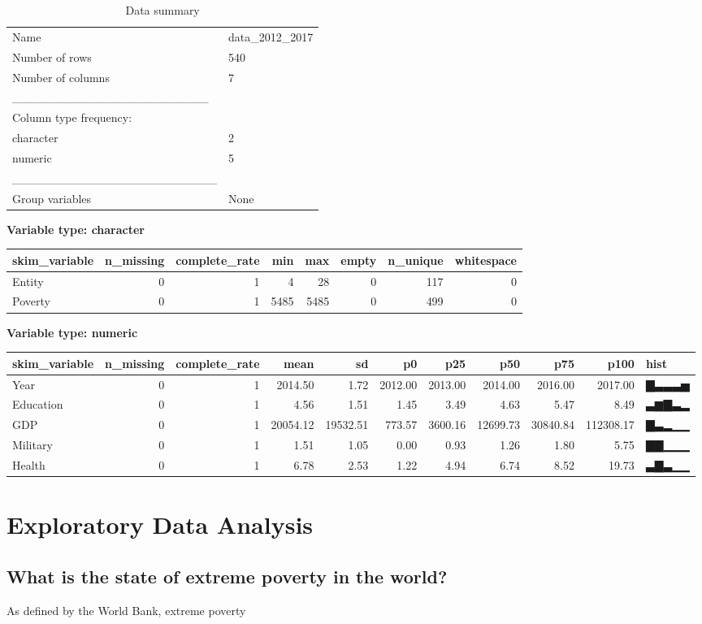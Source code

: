\documentclass[
]{article}
\begin{document}
\begin{longtable}[]{@{}ll@{}}
\caption{Data summary}\tabularnewline
\toprule
\endhead
Name & data\_2012\_2017 \\
Number of rows & 540 \\
Number of columns & 7 \\
\_\_\_\_\_\_\_\_\_\_\_\_\_\_\_\_\_\_\_\_\_\_\_ & \\
Column type frequency: & \\
character & 2 \\
numeric & 5 \\
\_\_\_\_\_\_\_\_\_\_\_\_\_\_\_\_\_\_\_\_\_\_\_\_ & \\
Group variables & None \\
\bottomrule
\end{longtable}

\textbf{Variable type: character}

\begin{longtable}[]{@{}lrrrrrrr@{}}
\toprule
skim\_variable & n\_missing & complete\_rate & min & max & empty &
n\_unique & whitespace \\
\midrule
\endhead
Entity & 0 & 1 & 4 & 28 & 0 & 117 & 0 \\
Poverty & 0 & 1 & 5485 & 5485 & 0 & 499 & 0 \\
\bottomrule
\end{longtable}

\textbf{Variable type: numeric}

\begin{longtable}[]{@{}lrrrrrrrrrl@{}}
\toprule
skim\_variable & n\_missing & complete\_rate & mean & sd & p0 & p25 &
p50 & p75 & p100 & hist \\
\midrule
\endhead
Year & 0 & 1 & 2014.50 & 1.72 & 2012.00 & 2013.00 & 2014.00 & 2016.00 &
2017.00 & ▇▃▃▃▅ \\
Education & 0 & 1 & 4.56 & 1.51 & 1.45 & 3.49 & 4.63 & 5.47 & 8.49 &
▃▆▇▃▂ \\
GDP & 0 & 1 & 20054.12 & 19532.51 & 773.57 & 3600.16 & 12699.73 &
30840.84 & 112308.17 & ▇▃▂▁▁ \\
Military & 0 & 1 & 1.51 & 1.05 & 0.00 & 0.93 & 1.26 & 1.80 & 5.75 &
▇▇▁▁▁ \\
Health & 0 & 1 & 6.78 & 2.53 & 1.22 & 4.94 & 6.74 & 8.52 & 19.73 &
▃▇▃▁▁ \\
\bottomrule
\end{longtable}

\hypertarget{exploratory-data-analysis-1}{%
\section{Exploratory Data Analysis}\label{exploratory-data-analysis-1}}

\hypertarget{what-is-the-state-of-extreme-poverty-in-the-world-1}{%
\subsection{What is the state of extreme poverty in the
world?}\label{what-is-the-state-of-extreme-poverty-in-the-world-1}}

As defined by the World Bank, extreme poverty
\end{document}
